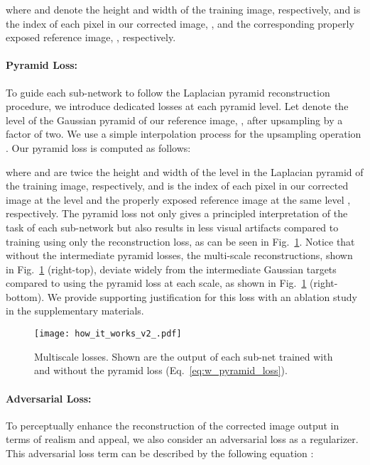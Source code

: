 \documentclass[final]{cvpr}
\begin{document}
where  and  denote the height and width of the training image, respectively, and
 is the index of each pixel in our corrected image, , and the
corresponding properly exposed reference image, , respectively.

\paragraph{Pyramid Loss:}
To guide each sub-network to follow the Laplacian pyramid reconstruction procedure, we introduce dedicated losses at each pyramid level.  Let  denote the   level of the Gaussian pyramid of our reference image, , after upsampling by a factor of two. We use a simple interpolation process for the upsampling operation \cite{mertens2009exposure}. Our pyramid loss is computed as follows:

where  and  are twice the height and width of the  level in the Laplacian pyramid of the training image, respectively, and
 is the index of each pixel in our corrected image at the  level  and the
properly exposed reference image at the same level , respectively. The pyramid loss not only gives a principled interpretation of the task of each sub-network but also results in less visual artifacts compared to training using only the reconstruction loss, as can be seen in Fig.~\ref{fig:how_it_works}. Notice that without the intermediate pyramid losses, the multi-scale reconstructions, shown in Fig.\ \ref{fig:how_it_works} (right-top), deviate widely from the intermediate Gaussian targets compared to using the pyramid loss at each scale, as shown in Fig.\ \ref{fig:how_it_works} (right-bottom). We provide supporting justification for this loss with an ablation study in the supplementary materials.

\begin{figure}[b]
\centering
\texttt{[image: how\_it\_works\_v2\_.pdf]}
\vspace{-6mm}
\caption{Multiscale losses. Shown are the output of each sub-net trained with and without the pyramid loss (Eq.\ \ref{eq:w_pyramid_loss}).}
\label{fig:how_it_works}
\end{figure}

\paragraph{Adversarial Loss:} To perceptually enhance the reconstruction of the corrected image output in terms of realism and appeal, we also consider an adversarial loss as a regularizer.
This adversarial loss term can be described by the following equation \cite{goodfellow2014generative}:
\end{document}
